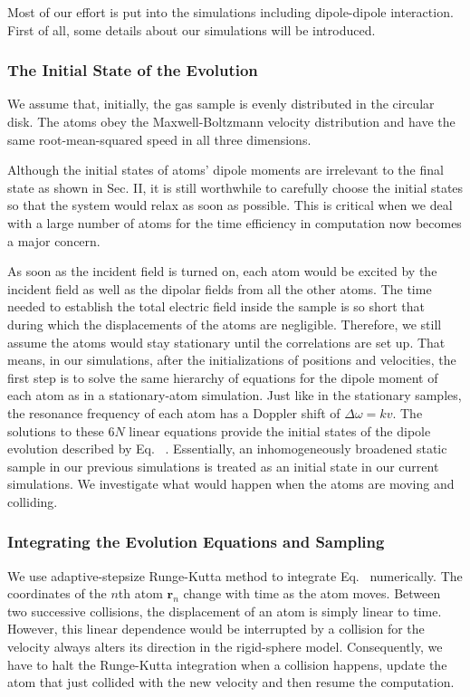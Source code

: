 Most of our effort is put into the simulations including dipole-dipole interaction. First of all, some details about our simulations will be introduced. 

\subsubsection{The Initial State of the Evolution}

We assume that, initially, the gas sample is evenly distributed in the circular disk. The atoms obey the Maxwell-Boltzmann velocity distribution and have the same root-mean-squared speed in all three dimensions.

Although the initial states of atoms' dipole moments are irrelevant to the final state as shown in Sec. II, it is still worthwhile to carefully choose the initial states so that the system would relax as soon as possible. This is critical when we deal with a large number of atoms for the time efficiency in computation now becomes a major concern. 

As soon as the incident field is turned on, each atom would be excited by the incident field as well as the dipolar fields from all the other atoms. The time needed to establish the total electric field inside the sample is so short that during which the displacements of the atoms are negligible.  Therefore, we still assume the atoms would stay stationary until the correlations are set up. That means, in our simulations, after the initializations of positions and velocities, the first step is to solve the same hierarchy of equations for the dipole moment of each atom as in a stationary-atom simulation. Just like in the stationary samples, the resonance frequency of each atom has a Doppler shift of $\Delta\omega=kv$. The solutions to these $6N$ linear equations provide the initial states of the dipole evolution described by Eq. ~. Essentially, an inhomogeneously broadened static sample in our previous simulations is treated as an initial state in our current simulations. We investigate what would happen when the atoms are moving and colliding.

\subsubsection{Integrating the Evolution Equations and Sampling}

We use adaptive-stepsize Runge-Kutta method to integrate Eq.~ numerically. The coordinates of the $n$th atom $\mathbf{r}_n$ change with time as the atom moves. Between two successive collisions, the displacement of an atom is simply linear to time. However, this linear dependence would be interrupted by a collision for the velocity always alters its direction in the rigid-sphere model. Consequently, we have to halt the Runge-Kutta integration when a collision happens, update the atom that just collided with the new velocity and then resume the computation.


